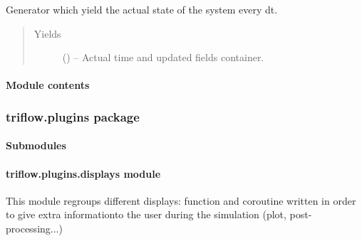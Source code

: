 \documentclass[letterpaper,10pt,english]{sphinxmanual}
\begin{document}
\begin{fulllineitems}
\begin{fulllineitems}
\label{\detokenize{triflow.core:triflow.core.simulation.Simulation.compute}}
Generator which yield the actual state of the system every dt.
\begin{quote}\begin{description}
\item[{Yields}] \leavevmode
{} () -- Actual time and updated fields container.

\end{description}\end{quote}

\end{fulllineitems}


\end{fulllineitems}



\paragraph{Module contents}
\label{\detokenize{triflow.core:module-contents}}\label{\detokenize{triflow.core:module-triflow.core}}

\subsubsection{triflow.plugins package}
\label{\detokenize{triflow.plugins::doc}}\label{\detokenize{triflow.plugins:triflow-plugins-package}}

\paragraph{Submodules}
\label{\detokenize{triflow.plugins:submodules}}

\paragraph{triflow.plugins.displays module}
\label{\detokenize{triflow.plugins:triflow-plugins-displays-module}}\label{\detokenize{triflow.plugins:module-triflow.plugins.displays}}
This module regroups different displays: function and coroutine written
in order to give extra informationto the user during the simulation
(plot, post-processing...)
\end{document}
